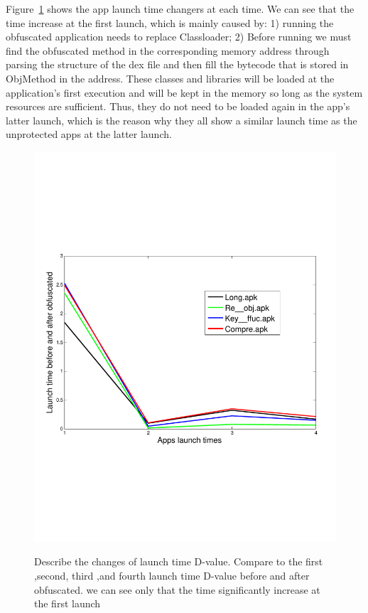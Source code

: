 Figure~\ref{fig:Figure 8} shows the app launch time changers at each time. We can see that the time increase at the first launch, which is mainly caused by: 1) running the obfuscated application needs to replace Classloader; 2) Before running we must find the obfuscated method in the corresponding memory address through parsing the structure of the dex file and then fill the bytecode that is stored in ObjMethod in the address. These classes and libraries will be loaded at the application's first execution and will be kept in the memory so long as the system resources are sufficient. Thus, they do not need to be loaded again in the app's latter launch, which is the reason why they all show a similar launch time as the unprotected apps at the latter launch.

\begin{figure}
  \centering
  \includegraphics[width=0.8\columnwidth]{fig/fig8.pdf}\\
  \caption{Describe the changes of launch time D-value. Compare to the first ,second, third ,and fourth launch time D-value before and after obfuscated. we can see only that the time significantly increase at the first launch  }\label{fig:Figure 8}
\end{figure}


